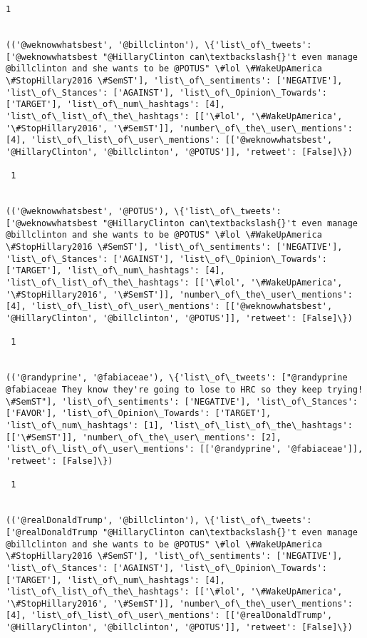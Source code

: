\documentclass[11pt]{article}
\begin{document}
\begin{Verbatim}[commandchars=\\\{\}]
 1
 

(('@weknowwhatsbest', '@billclinton'), \{'list\_of\_tweets': ['@weknowwhatsbest "@HillaryClinton can\textbackslash{}'t even manage @billclinton and she wants to be @POTUS" \#lol \#WakeUpAmerica \#StopHillary2016 \#SemST'], 'list\_of\_sentiments': ['NEGATIVE'], 'list\_of\_Stances': ['AGAINST'], 'list\_of\_Opinion\_Towards': ['TARGET'], 'list\_of\_num\_hashtags': [4], 'list\_of\_list\_of\_the\_hashtags': [['\#lol', '\#WakeUpAmerica', '\#StopHillary2016', '\#SemST']], 'number\_of\_the\_user\_mentions': [4], 'list\_of\_list\_of\_user\_mentions': [['@weknowwhatsbest', '@HillaryClinton', '@billclinton', '@POTUS']], 'retweet': [False]\})

 1
 

(('@weknowwhatsbest', '@POTUS'), \{'list\_of\_tweets': ['@weknowwhatsbest "@HillaryClinton can\textbackslash{}'t even manage @billclinton and she wants to be @POTUS" \#lol \#WakeUpAmerica \#StopHillary2016 \#SemST'], 'list\_of\_sentiments': ['NEGATIVE'], 'list\_of\_Stances': ['AGAINST'], 'list\_of\_Opinion\_Towards': ['TARGET'], 'list\_of\_num\_hashtags': [4], 'list\_of\_list\_of\_the\_hashtags': [['\#lol', '\#WakeUpAmerica', '\#StopHillary2016', '\#SemST']], 'number\_of\_the\_user\_mentions': [4], 'list\_of\_list\_of\_user\_mentions': [['@weknowwhatsbest', '@HillaryClinton', '@billclinton', '@POTUS']], 'retweet': [False]\})

 1
 

(('@randyprine', '@fabiaceae'), \{'list\_of\_tweets': ["@randyprine @fabiaceae They know they're going to lose to HRC so they keep trying! \#SemST"], 'list\_of\_sentiments': ['NEGATIVE'], 'list\_of\_Stances': ['FAVOR'], 'list\_of\_Opinion\_Towards': ['TARGET'], 'list\_of\_num\_hashtags': [1], 'list\_of\_list\_of\_the\_hashtags': [['\#SemST']], 'number\_of\_the\_user\_mentions': [2], 'list\_of\_list\_of\_user\_mentions': [['@randyprine', '@fabiaceae']], 'retweet': [False]\})

 1
 

(('@realDonaldTrump', '@billclinton'), \{'list\_of\_tweets': ['@realDonaldTrump "@HillaryClinton can\textbackslash{}'t even manage @billclinton and she wants to be @POTUS" \#lol \#WakeUpAmerica \#StopHillary2016 \#SemST'], 'list\_of\_sentiments': ['NEGATIVE'], 'list\_of\_Stances': ['AGAINST'], 'list\_of\_Opinion\_Towards': ['TARGET'], 'list\_of\_num\_hashtags': [4], 'list\_of\_list\_of\_the\_hashtags': [['\#lol', '\#WakeUpAmerica', '\#StopHillary2016', '\#SemST']], 'number\_of\_the\_user\_mentions': [4], 'list\_of\_list\_of\_user\_mentions': [['@realDonaldTrump', '@HillaryClinton', '@billclinton', '@POTUS']], 'retweet': [False]\})


\end{Verbatim}
\end{document}
